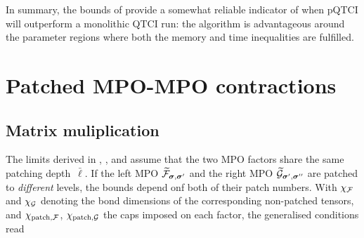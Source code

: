 In summary, the bounds of  provide a somewhat reliable
indicator of when pQTCI will outperform a monolithic QTCI run: the algorithm is advantageous around the parameter regions where both the memory and time inequalities are fulfilled.

\section{Patched MPO-MPO contractions}
\label{sec:PatchContrbounds}
\subsection{Matrix muliplication}
The limits derived in , , and  assume that the
two MPO factors share the same patching depth~\(\bar\ell\).  If the left MPO \(\widetilde{\mathcal{F}}_{\boldsymbol{\sigma},\boldsymbol{\sigma}'}\) and the right MPO
\(\widetilde{\mathcal{G}}_{\boldsymbol{\sigma}',\boldsymbol{\sigma}''}\) are patched to \emph{different} levels, the bounds depend onf both of their patch numbers. With \(\chi_{\mathcal{F}}\) and \(\chi_{\mathcal{G}}\) denoting the bond dimensions of the corresponding non-patched tensors, and \(\chi_{\text{patch},\mathcal{F}}\), \(\chi_{\text{patch},\mathcal{G}}\) the caps imposed on each factor, the generalised conditions read

